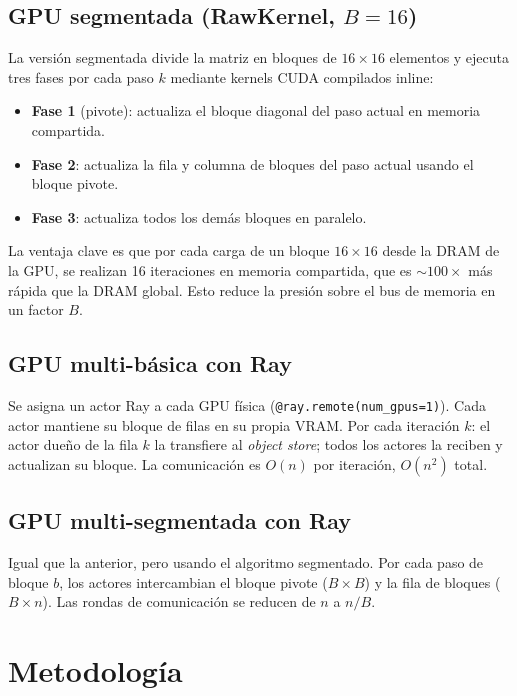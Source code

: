 \documentclass[conference]{IEEEtran}
\begin{document}
\subsection{GPU segmentada (RawKernel, $B=16$)}

La versión segmentada divide la matriz en bloques de $16 \times 16$
elementos y ejecuta tres fases por cada paso $k$ mediante kernels CUDA
compilados inline:

\begin{itemize}
  \item \textbf{Fase 1} (pivote): actualiza el bloque diagonal del paso
        actual en memoria compartida.
  \item \textbf{Fase 2}: actualiza la fila y columna de bloques del paso
        actual usando el bloque pivote.
  \item \textbf{Fase 3}: actualiza todos los demás bloques en paralelo.
\end{itemize}

La ventaja clave es que por cada carga de un bloque $16 \times 16$
desde la DRAM de la GPU, se realizan 16 iteraciones en memoria
compartida, que es $\sim100\times$ más rápida que la DRAM global.
Esto reduce la presión sobre el bus de memoria en un factor $B$.

\subsection{GPU multi-básica con Ray}

Se asigna un actor Ray a cada GPU física
(\texttt{@ray.remote(num\_gpus=1)}). Cada actor mantiene su bloque de
filas en su propia VRAM. Por cada iteración $k$: el actor dueño de la
fila $k$ la transfiere al \textit{object store}; todos los actores la
reciben y actualizan su bloque. La comunicación es $O(n)$ por
iteración, $O(n^2)$ total.

\subsection{GPU multi-segmentada con Ray}

Igual que la anterior, pero usando el algoritmo segmentado. Por cada
paso de bloque $b$, los actores intercambian el bloque pivote
($B \times B$) y la fila de bloques ($B \times n$). Las rondas de
comunicación se reducen de $n$ a $n/B$.

\section{Metodología}
\label{sec:metodologia}
\end{document}
